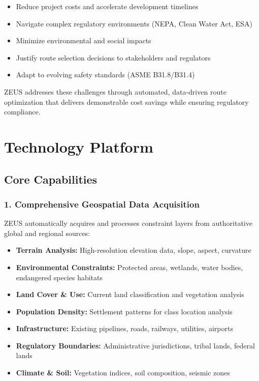 \documentclass[11pt,letterpaper]{article}
\begin{document}
\begin{itemize}[leftmargin=*]
    \item Reduce project costs and accelerate development timelines
    \item Navigate complex regulatory environments (NEPA, Clean Water Act, ESA)
    \item Minimize environmental and social impacts
    \item Justify route selection decisions to stakeholders and regulators
    \item Adapt to evolving safety standards (ASME B31.8/B31.4)
\end{itemize}

ZEUS addresses these challenges through automated, data-driven route optimization that delivers demonstrable cost savings while ensuring regulatory compliance.

\newpage

\section{Technology Platform}

\subsection{Core Capabilities}

\subsubsection{1. Comprehensive Geospatial Data Acquisition}

ZEUS automatically acquires and processes constraint layers from authoritative global and regional sources:

\begin{itemize}[leftmargin=*]
    \item \textbf{Terrain Analysis:} High-resolution elevation data, slope, aspect, curvature
    \item \textbf{Environmental Constraints:} Protected areas, wetlands, water bodies, endangered species habitats
    \item \textbf{Land Cover \& Use:} Current land classification and vegetation analysis
    \item \textbf{Population Density:} Settlement patterns for class location analysis
    \item \textbf{Infrastructure:} Existing pipelines, roads, railways, utilities, airports
    \item \textbf{Regulatory Boundaries:} Administrative jurisdictions, tribal lands, federal lands
    \item \textbf{Climate \& Soil:} Vegetation indices, soil composition, seismic zones
\end{itemize}
\end{document}
